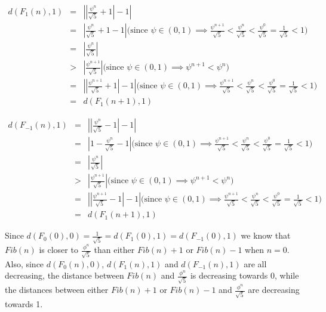 \documentclass{minimal}
\begin{document}
\begin{eqnarray*}
  d(F_1(n), 1) &=& \left|\left|\frac{\psi^n}{\sqrt{5}} + 1\right| - 1\right|
            \\ &=& \left|\frac{\psi^n}{\sqrt{5}} + 1 - 1\right| \text{(since $\psi \in (0,1) \implies \frac{\psi^{n+1}}{\sqrt{5}} < \frac{\psi^n}{\sqrt{5}} < \frac{\psi^0}{\sqrt{5}} = \frac{1}{\sqrt{5}} < 1$)}
            \\ &=& \left|\frac{\psi^n}{\sqrt{5}}\right|
            \\ &>& \left|\frac{\psi^{n+1}}{\sqrt{5}}\right| \text{(since $\psi \in (0,1) \implies \psi^{n+1} < \psi^n$)}
            \\ &=& \left|\left|\frac{\psi^{n+1}}{\sqrt{5}} + 1\right| - 1\right| \text{(since $\psi \in (0,1) \implies \frac{\psi^{n+1}}{\sqrt{5}} < \frac{\psi^n}{\sqrt{5}} < \frac{\psi^0}{\sqrt{5}} = \frac{1}{\sqrt{5}} < 1$)}
            \\ &=& d(F_1(n+1), 1)
\end{eqnarray*}

\begin{eqnarray*}
  d(F_{-1}(n), 1) &=& \left|\left|\frac{\psi^n}{\sqrt{5}} - 1\right| - 1\right|
            \\ &=& \left|1 - \frac{\psi^n}{\sqrt{5}} - 1\right| \text{(since $\psi \in (0,1) \implies \frac{\psi^{n+1}}{\sqrt{5}} < \frac{\psi^n}{\sqrt{5}} < \frac{\psi^0}{\sqrt{5}} = \frac{1}{\sqrt{5}} < 1$)}
            \\ &=& \left|\frac{\psi^n}{\sqrt{5}}\right|
            \\ &>& \left|\frac{\psi^{n+1}}{\sqrt{5}}\right| \text{(since $\psi \in (0,1) \implies \psi^{n+1} < \psi^n$)}
            \\ &=& \left|\left|\frac{\psi^{n+1}}{\sqrt{5}} - 1\right| - 1\right| \text{(since $\psi \in (0,1) \implies \frac{\psi^{n+1}}{\sqrt{5}} < \frac{\psi^n}{\sqrt{5}} < \frac{\psi^0}{\sqrt{5}} = \frac{1}{\sqrt{5}} < 1$)}
            \\ &=& d(F_1(n+1), 1)
\end{eqnarray*}

Since $d(F_0(0), 0) = \frac{1}{\sqrt{5}} = d(F_1(0), 1) = d(F_{-1}(0), 1)$ we
know that $Fib(n)$ is closer to $\frac{\phi^n}{\sqrt{5}}$ than either
$Fib(n)+1$ or $Fib(n)-1$ when $n = 0$. Also, since $d(F_0(n), 0)$, $d(F_1(n),
1)$ and $d(F_{-1}(n), 1)$ are all decreasing, the distance between $Fib(n)$ and
$\frac{\phi^n}{\sqrt{5}}$ is decreasing towards $0$, while the distances
between either $Fib(n)+1$ or $Fib(n)-1$ and $\frac{\phi^n}{\sqrt{5}}$ are
decreasing towards 1.
\end{document}
